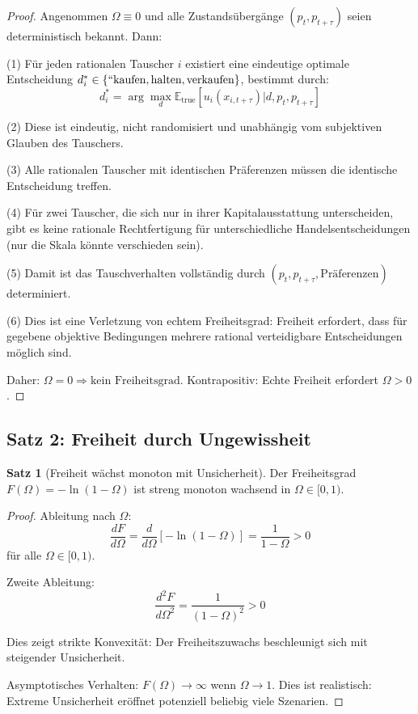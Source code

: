 \documentclass[a4paper, 12pt, twoside, openright]{report}
\theoremstyle{definition}
\theoremstyle{definition}
\newtheorem{satz}{Satz}[chapter]
\begin{document}
\begin{proof}
    Angenommen $\Omega \equiv 0$ und alle Zustandsübergänge $(p_t, p_{t+\tau})$ seien deterministisch bekannt. Dann:
    
    (1) Für jeden rationalen Tauscher $i$ existiert eine eindeutige optimale Entscheidung $d_i^* \in \{``\text{kaufen}, \text{halten}, \text{verkaufen}\}$, bestimmt durch:
    \begin{equation}
        d_i^* = \arg\max_d \mathbb{E}_{\text{true}}[u_i(x_{i,t+\tau}) | d, p_t, p_{t+\tau}]
    \end{equation}
    
    (2) Diese ist eindeutig, nicht randomisiert und unabhängig vom subjektiven Glauben des Tauschers.
    
    (3) Alle rationalen Tauscher mit identischen Präferenzen müssen die identische Entscheidung treffen.
    
    (4) Für zwei Tauscher, die sich nur in ihrer Kapitalausstattung unterscheiden, gibt es keine rationale Rechtfertigung für unterschiedliche Handelsentscheidungen (nur die Skala könnte verschieden sein).
    
    (5) Damit ist das Tauschverhalten vollständig durch $(p_t, p_{t+\tau}, \text{Präferenzen})$ determiniert.
    
    (6) Dies ist eine Verletzung von echtem Freiheitsgrad: Freiheit erfordert, dass für gegebene objektive Bedingungen mehrere rational verteidigbare Entscheidungen möglich sind.
    
    Daher: $\Omega = 0 \Rightarrow \text{kein Freiheitsgrad}$. Kontrapositiv: Echte Freiheit erfordert $\Omega > 0$.
\end{proof}

\subsection{Satz 2: Freiheit durch Ungewissheit}

\begin{satz}[Freiheit wächst monoton mit Unsicherheit]
    \label{satz:freiheit_omega}
    Der Freiheitsgrad $F(\Omega) = -\ln(1-\Omega)$ ist streng monoton wachsend in $\Omega \in [0,1)$.
\end{satz}

\begin{proof}
    Ableitung nach $\Omega$:
    \begin{equation}
        \frac{dF}{d\Omega} = \frac{d}{d\Omega}[-\ln(1-\Omega)] = \frac{1}{1-\Omega} > 0
    \end{equation}
    für alle $\Omega \in [0,1)$.
    
    Zweite Ableitung:
    \begin{equation}
        \frac{d^2F}{d\Omega^2} = \frac{1}{(1-\Omega)^2} > 0
    \end{equation}
    
    Dies zeigt strikte Konvexität: Der Freiheitszuwachs beschleunigt sich mit steigender Unsicherheit.
    
    Asymptotisches Verhalten: $F(\Omega) \to \infty$ wenn $\Omega \to 1$. Dies ist realistisch: Extreme Unsicherheit eröffnet potenziell beliebig viele Szenarien.
\end{proof}
\end{document}
